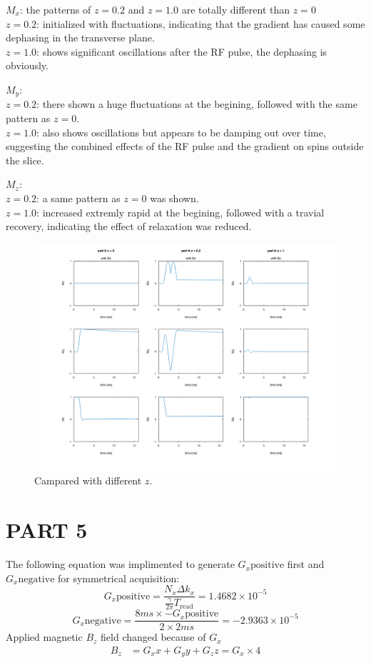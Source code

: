 \documentclass{report}
\begin{document}
$M_x$: the patterns of $z = 0.2$ and $z = 1.0$ are totally different than $z = 0$\\
$z = 0.2$: initialized with fluctuations, indicating that the gradient has caused some dephasing in the transverse plane.\\
$z = 1.0$: shows significant oscillations after the RF pulse, the dephasing is obviously.\vspace{\baselineskip}

$M_y$:\\ 
$z = 0.2$: there shown a huge fluctuations at the begining, followed with the same pattern as $z = 0$.\\
$z = 1.0$: also shows oscillations but appears to be damping out over time, suggesting the combined effects of 
the RF pulse and the gradient on spins outside the slice.\vspace{\baselineskip}

$M_z$:\\ 
$z = 0.2$: a same pattern as $z = 0$ was shown.\\ $z = 1.0$: increased extremly rapid at the begining, 
followed with a travial recovery, indicating the effect of relaxation was reduced.\vspace{\baselineskip}

\begin{figure}[hb]
    \centering
    \includegraphics[width=1\textwidth]{4.png}
    \caption{Campared with different $z$.}
\end{figure}
\newpage  
\section[short]{PART 5}
The following equation was implimented to generate $G_x{\text{positive}}$ first and $G_x{\text{negative}}$ for symmetrical acquisition:
\[
G_x{\text{positive}} = \frac{N_x \Delta k_x}{\frac{\gamma}{2\pi} T_{\text{read}}} = 1.4682 \times 10^{-5}
\]
\[
G_x{\text{negative}} = \frac{8ms \times -G_x{\text{positive}}}{2 \times 2ms} = - 2.9363 \times 10^{-5}
\]
Applied magnetic $B_z$ field changed because of $G_x$ 
\begin{align*}
    B_z &= G_{x} x + G_{y} y + G_{z} z = G_x \times 4
\end{align*}
\end{document}
